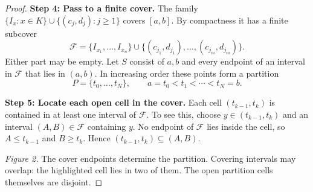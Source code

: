 \documentclass[11pt]{article}
\begin{document}
\begin{proof}
\textbf{Step 4: Pass to a finite cover.}
The family $\{I_x:x\in K\}\cup\{(c_j,d_j):j\geq1\}$ covers $[a,b]$. By compactness it has a finite subcover
\[
 \mathcal F=\{I_{x_1},\ldots,I_{x_n}\}\cup
 \{(c_{j_1},d_{j_1}),\ldots,(c_{j_m},d_{j_m})\}.
\]
Either part may be empty. Let $S$ consist of $a,b$ and every endpoint of an interval in $\mathcal F$ that lies in $(a,b)$. In increasing order these points form a partition
\[
 P=\{t_0,\ldots,t_N\},\qquad a=t_0<t_1<\cdots<t_N=b.
\]

\textbf{Step 5: Locate each open cell in the cover.}
Each cell $(t_{k-1},t_k)$ is contained in at least one interval of $\mathcal F$. To see this, choose $y\in(t_{k-1},t_k)$ and an interval $(A,B)\in\mathcal F$ containing $y$. No endpoint of $\mathcal F$ lies inside the cell, so $A\leq t_{k-1}$ and $B\geq t_k$. Hence $(t_{k-1},t_k)\subseteq(A,B)$.

\begin{center}
\end{center}
\textit{Figure 2.} The cover endpoints determine the partition. Covering intervals may overlap: the highlighted cell lies in two of them. The open partition cells themselves are disjoint.


\end{proof}
\end{document}
